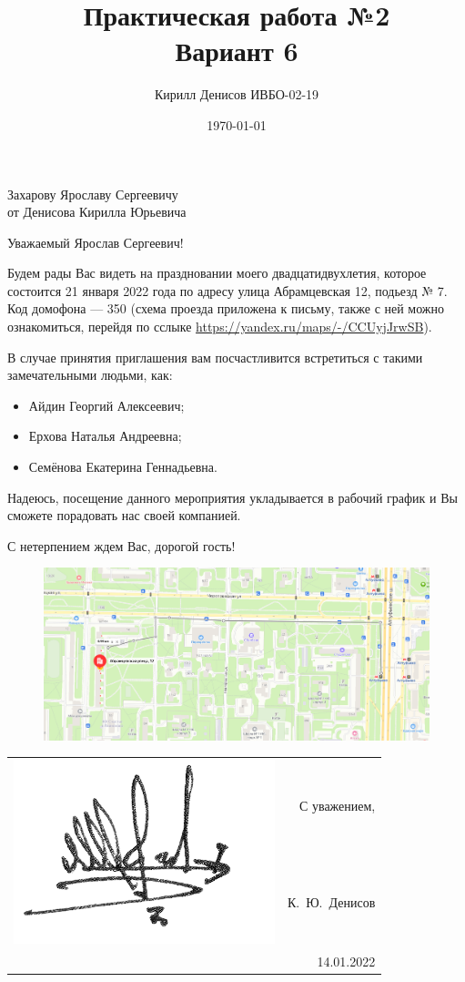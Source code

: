 \documentclass[a4paper,14pt]{extarticle}
\author{Кирилл Денисов ИВБО-02-19}
\title{Практическая работа №2\\Вариант 6}
\date{\today}
\begin{document}
	\thispagestyle{empty}

\begin{flushright}
	Захарову Ярославу Сергеевичу\\
	от Денисова Кирилла Юрьевича
\end{flushright}
\vspace{4em}

Уважаемый Ярослав Сергеевич!

Будем рады Вас видеть на праздновании моего двадцатидвухлетия, которое состоится 21 января 2022 года по адресу улица Абрамцевская 12, подьезд № 7. Код домофона --- 350 (схема проезда приложена к письму, также с ней можно ознакомиться, перейдя по сслыке \href{https://yandex.ru/maps/-/CCUyjJrwSB}{{https://yandex.ru/maps/-/CCUyjJrwSB}}).



В случае принятия приглашения вам посчастливится встретиться с такими замечательными людьми, как:
\begin{itemize}
	\item Айдин Георгий Алексеевич;
	\item Ерхова Наталья Андреевна;
	\item Семёнова Екатерина Геннадьевна.
\end{itemize} 

Надеюсь, посещение данного мероприятия укладывается в рабочий график и Вы сможете порадовать нас своей компанией. 

С нетерпением ждем Вас, дорогой гость!



\begin{figure}[h!]
	\centering
	\includegraphics[width=0.8\linewidth]{screenshot001}

\end{figure}


\begin{flushright}
	\begin{tabular}{cr}
			\multirow{2}{*}{\includegraphics[width=0.14\linewidth]{../../../Common/denisov-signature}}&  С уважением,\\
	&
		К.~Ю.~Денисов\\
		& 14.01.2022\\
	\end{tabular}
	
	
	
\end{flushright}
\end{document}
